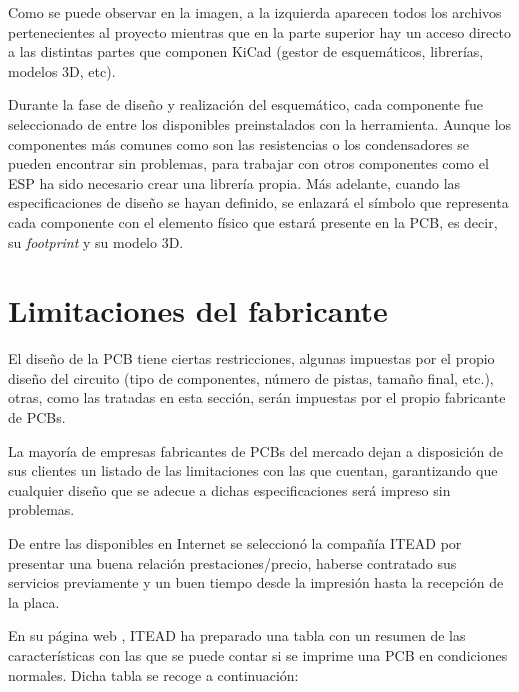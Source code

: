 Como se puede observar en la imagen, a la izquierda aparecen todos los archivos pertenecientes al proyecto mientras que en la parte superior hay un acceso directo a las distintas partes que componen KiCad (gestor de esquemáticos, librerías, modelos 3D, etc).

Durante la fase de diseño y realización del esquemático, cada componente fue seleccionado de entre los disponibles preinstalados con la herramienta. Aunque los componentes más comunes como son las resistencias o los condensadores se pueden encontrar sin problemas, para trabajar con otros componentes como el ESP ha sido necesario crear una librería propia. Más adelante, cuando las especificaciones de diseño se hayan definido, se enlazará el símbolo que representa cada componente con el elemento físico que estará presente en la \acrshort{PCB}, es decir, su \textit{footprint} y su modelo 3D.

\section{Limitaciones del fabricante\label{sec:ITEAD_PCB}}

El diseño de la PCB tiene ciertas restricciones, algunas impuestas por el propio diseño del circuito (tipo de componentes, número de pistas, tamaño final, etc.), otras, como las tratadas en esta sección, serán impuestas por el propio fabricante de \acrshort{PCB}s.

La mayoría de empresas fabricantes de PCBs del mercado dejan a disposición de sus clientes un listado de las limitaciones con las que cuentan, garantizando que cualquier diseño que se adecue a dichas especificaciones será impreso sin problemas. 

De entre las disponibles en Internet se seleccionó la compañía ITEAD por presentar una buena relación prestaciones/precio, haberse contratado sus servicios previamente y un buen tiempo desde la impresión hasta la recepción de la placa.

En su página web \cite{ITEAD_PCB_Limitations}, ITEAD ha preparado una tabla con un resumen de las características con las que se puede contar si se imprime una PCB en condiciones normales. Dicha tabla se recoge a continuación:

